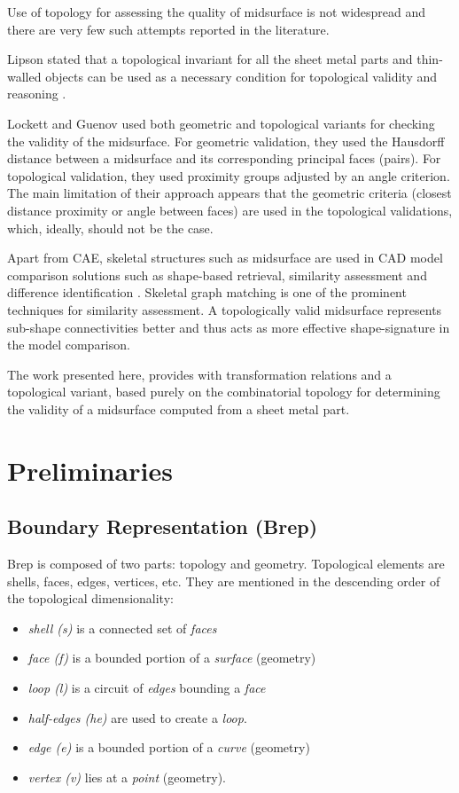 Use of topology for assessing the quality of midsurface is not widespread and there are very few such attempts reported in the literature.


Lipson \cite{Lipson} stated that a topological invariant for all the sheet metal parts and thin-walled objects can be used as a necessary condition for topological validity and reasoning .  

Lockett and Guenov \cite{Lockett2008} used both geometric and topological variants for checking the validity of the midsurface. For geometric validation, they used the Hausdorff distance between a midsurface and its corresponding principal faces (pairs). For topological validation, they used proximity groups adjusted by an angle criterion. The main limitation of their approach appears that the geometric criteria (closest distance proximity or angle between faces) are used in the topological validations, which, ideally, should not be the case.

Apart from CAE, skeletal structures such as midsurface are used in CAD model comparison solutions such as shape-based retrieval, similarity assessment and difference identification  \cite{Antoine2014}. Skeletal graph matching is one of the prominent techniques \cite{Iyer2005} for similarity assessment. A topologically valid midsurface represents sub-shape connectivities better and thus acts as more effective shape-signature in the model comparison.

The work presented here, provides with transformation relations and a topological variant, based purely on the combinatorial topology for determining the validity of a midsurface computed from a sheet metal part.

\section{Preliminaries}\label{sec_preliminaries}
\subsection{Boundary Representation (Brep)}

Brep is composed of two parts: topology and geometry. Topological elements are shells, faces, edges, vertices, etc. They are mentioned in the descending order of the topological dimensionality:

\begin{itemize}
[noitemsep,topsep=2pt,parsep=2pt,partopsep=2pt]
\item {\em shell (s)}  is a connected set of {\em faces}
\item {\em face (f)} is a bounded portion of a {\em surface} (geometry)
\item {\em loop (l)} is a circuit of {\em edges} bounding a {\em face}
\item {\em half-edges (he)} are used to create a {\em loop}.
\item {\em edge (e)} is a bounded portion of a {\em curve} (geometry)
\item {\em vertex (v)} lies at a {\em point} (geometry). 
\end{itemize}

